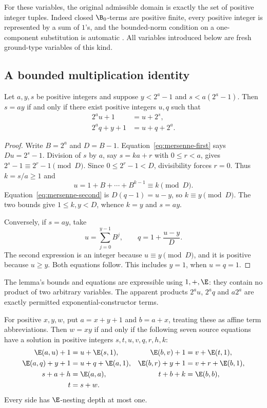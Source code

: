 \documentclass[11pt]{article}
\begin{document}
For these variables, the original admissible domain is exactly the set
of positive integer tuples. Indeed closed $\B_0$-terms are positive
finite, every positive integer is represented by a sum of $1$'s, and
the bounded-norm condition on a one-component substitution is automatic
\cite[Definitions~2.5--2.7]{WW}. All variables introduced below are
fresh ground-type variables of this kind.

\subsection{A bounded multiplication identity}

\begin{lemma}\label{lem:restricted-product}
Let $a,y,s$ be positive integers and suppose
$y<2^a-1$ and $s<a(2^a-1)$. Then $s=ay$ if and only if there exist
positive integers $u,q$ such that
\begin{align}
 2^a u+1&=u+2^s,\label{eq:mersenne-first}\\
 2^a q+y+1&=u+q+2^a.\label{eq:mersenne-second}
\end{align}
\end{lemma}

\begin{proof}
Write $B=2^a$ and $D=B-1$. Equation~\eqref{eq:mersenne-first} says
$Du=2^s-1$. Division of $s$ by $a$, say $s=ka+r$ with $0\le r<a$,
gives $2^s-1\equiv2^r-1\pmod D$. Since
$0\le2^r-1<D$, divisibility forces $r=0$. Thus $k=s/a\ge1$ and
\[
 u=1+B+\cdots+B^{k-1}\equiv k\pmod D.
\]
Equation~\eqref{eq:mersenne-second} is $D(q-1)=u-y$, so
$k\equiv y\pmod D$. The two bounds give $1\le k,y<D$, whence
$k=y$ and $s=ay$.

Conversely, if $s=ay$, take
\[
 u=\sum_{j=0}^{y-1}B^j,
 \qquad q=1+\frac{u-y}{D}.
\]
The second expression is an integer because $u\equiv y\pmod D$,
and it is positive because $u\ge y$. Both equations follow.
This includes $y=1$, when $u=q=1$.
\end{proof}

The lemma's bounds and equations are expressible using $1,+,\E$:
they contain no product of two arbitrary variables. The apparent
products $2^a u$, $2^a q$ and $a2^a$ are exactly permitted
exponential-constructor terms.

\begin{lemma}
\label{lem:seven-equations}
For positive $x,y,w$, put $a=x+y+1$ and $b=a+x$, treating these as
affine term abbreviations. Then $w=xy$ if and only if the following
seven source equations have a solution in positive integers
$s,t,u,v,q,r,h,k$:
\begin{align*}
 \E(a,u)+1&=u+\E(s,1),&
 \E(b,v)+1&=v+\E(t,1),\\
 \E(a,q)+y+1&=u+q+\E(a,1),&
 \E(b,r)+y+1&=v+r+\E(b,1),\\
 s+a+h&=\E(a,a),&
 t+b+k&=\E(b,b),\\
 t&=s+w.&&
\end{align*}
Every side has $\E$-nesting depth at most one.
\end{lemma}
\end{document}
